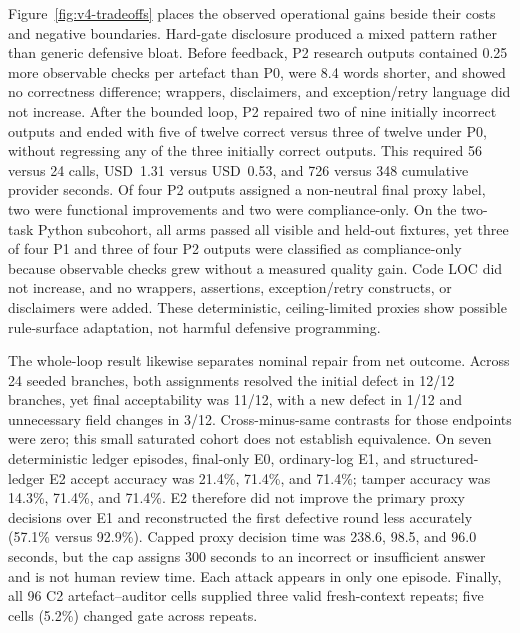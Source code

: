 \documentclass[11pt]{article}
\begin{document}
Figure~\ref{fig:v4-tradeoffs} places the observed operational gains beside their costs and negative boundaries. Hard-gate disclosure produced a mixed pattern rather than generic defensive bloat. Before feedback, P2 research outputs contained 0.25 more observable checks per artefact than P0, were 8.4 words shorter, and showed no correctness difference; wrappers, disclaimers, and exception/retry language did not increase. After the bounded loop, P2 repaired two of nine initially incorrect outputs and ended with five of twelve correct versus three of twelve under P0, without regressing any of the three initially correct outputs. This required 56 versus 24 calls, USD~1.31 versus USD~0.53, and 726 versus 348 cumulative provider seconds. Of four P2 outputs assigned a non-neutral final proxy label, two were functional improvements and two were compliance-only. On the two-task Python subcohort, all arms passed all visible and held-out fixtures, yet three of four P1 and three of four P2 outputs were classified as compliance-only because observable checks grew without a measured quality gain. Code LOC did not increase, and no wrappers, assertions, exception/retry constructs, or disclaimers were added. These deterministic, ceiling-limited proxies show possible rule-surface adaptation, not harmful defensive programming.

The whole-loop result likewise separates nominal repair from net outcome. Across 24 seeded branches, both assignments resolved the initial defect in 12/12 branches, yet final acceptability was 11/12, with a new defect in 1/12 and unnecessary field changes in 3/12. Cross-minus-same contrasts for those endpoints were zero; this small saturated cohort does not establish equivalence. On seven deterministic ledger episodes, final-only E0, ordinary-log E1, and structured-ledger E2 accept accuracy was 21.4\%, 71.4\%, and 71.4\%; tamper accuracy was 14.3\%, 71.4\%, and 71.4\%. E2 therefore did not improve the primary proxy decisions over E1 and reconstructed the first defective round less accurately (57.1\% versus 92.9\%). Capped proxy decision time was 238.6, 98.5, and 96.0 seconds, but the cap assigns 300 seconds to an incorrect or insufficient answer and is not human review time. Each attack appears in only one episode. Finally, all 96 C2 artefact--auditor cells supplied three valid fresh-context repeats; five cells (5.2\%) changed gate across repeats.
\end{document}
